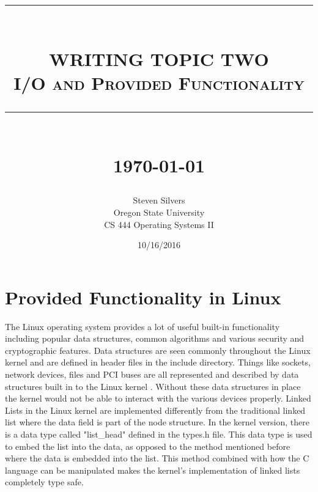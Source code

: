 \documentclass[10pt,serif,draftclsnofoot,onecolumn]{IEEEtran}
\newcommand{\HRule}[1]{\rule{\linewidth}{#1}}
\begin{document}
	\begin{titlepage}


	\title{ \normalsize \textsc{}
			\\ [2.0cm]
			\HRule{0.5pt} \\
			\LARGE \textbf{\uppercase{Writing topic two}}
			\\ \normalsize \textsc{I/O and Provided Functionality}
			\HRule{2pt} \\ [0.5cm]
			\normalsize \today \vspace*{5\baselineskip}}
	\date{10/16/2016}
	
	\author{Steven Silvers \\
			Oregon State University \\
			CS 444 Operating Systems II}
	\maketitle
	\end{titlepage}
	\newpage
	\section{Provided Functionality in Linux}
	\par
			The Linux operating system provides a lot of useful built-in functionality including popular data structures, common algorithms and various security and cryptographic features\cite{2}. Data structures are seen commonly throughout the Linux kernel and are defined in header files in the include directory. Things like sockets, network devices, files and PCI buses are all represented and described by data structures built in to the Linux kernel \cite{1}. Without these data structures in place the kernel would not be able to interact with the various devices properly. Linked Lists in the Linux kernel are implemented differently from the traditional linked list where the data field is part of the node structure. In the kernel version, there is a data type called "list\_head" defined in the types.h file\cite{2}. This data type is used to embed the list into the data, as opposed to the method mentioned before where the data is embedded into the list. This method combined with how the C language can be manipulated makes the kernel's implementation of linked lists completely type safe.
	\newline
	\newline
	\par
		
	\newpage


	
	
\end{document}
